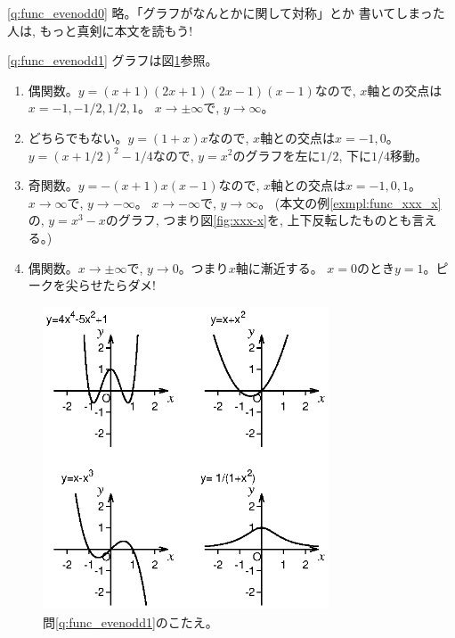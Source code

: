 \ref{q:func_evenodd0} 略。「グラフがなんとかに関して対称」とか
書いてしまった人は, もっと真剣に本文を読もう!
\mv

\ref{q:func_evenodd1}  グラフは図\ref{xxxx_minus_etc}参照。
\begin{enumerate}
\item 偶関数。$y=(x+1)(2x+1)(2x-1)(x-1)$なので, $x$軸との交点は$x=-1, -1/2, 1/2, 1$。
$x\rightarrow \pm \infty$で, $y\rightarrow \infty$。
\item どちらでもない。$y=(1+x)x$なので, $x$軸との交点は$x=-1, 0$。$y=(x+1/2)^2-1/4$なので, 
$y=x^2$のグラフを左に$1/2$, 下に$1/4$移動。
\item 奇関数。$y=-(x+1)x(x-1)$なので, $x$軸との交点は$x=-1, 0, 1$。
$x\rightarrow \infty$で, $y\rightarrow -\infty$。
$x\rightarrow -\infty$で, $y\rightarrow \infty$。
(本文の例\ref{exmpl:func_xxx_x}の, $y=x^3-x$のグラフ, つまり図\ref{fig:xxx-x}を, 上下反転したものとも言える。)
\item 偶関数。$x\rightarrow \pm \infty$で, $y\rightarrow 0$。つまり$x$軸に漸近する。
$x=0$のとき$y=1$。ピークを尖らせたらダメ!
\end{enumerate}
\mv

\begin{figure}[h]
    \centering
      \includegraphics[width=8.5cm]{xxxx_minus_etc.eps}
      \caption{問\ref{q:func_evenodd1}のこたえ。\label{xxxx_minus_etc}}
\end{figure}

